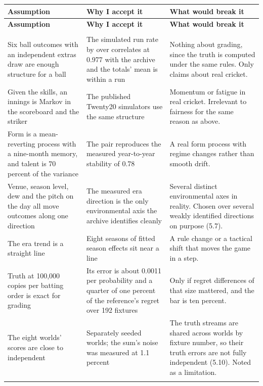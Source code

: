 \documentclass[11pt,letterpaper]{article}
\begin{document}
\begin{small}
\begin{longtable}{>{\raggedright\arraybackslash}p{}>{\raggedright\arraybackslash}p{}>{\raggedright\arraybackslash}p{}}
\toprule
\textbf{Assumption} & \textbf{Why I accept it} & \textbf{What would break it} \\ \midrule
\endfirsthead
\toprule
\textbf{Assumption} & \textbf{Why I accept it} & \textbf{What would break it} \\ \midrule
\endhead
\midrule \multicolumn{3}{r}{\footnotesize continued on the next page} \\ \endfoot
\bottomrule \endlastfoot
Six ball outcomes with an independent extras draw are enough structure for a ball & The simulated run rate by over correlates at 0.977 with the archive and the totals' mean is within a run & Nothing about grading, since the truth is computed under the same rules. Only claims about real cricket. \\ \addlinespace[2pt]
Given the skills, an innings is Markov in the scoreboard and the striker & The published Twenty20 simulators use the same structure & Momentum or fatigue in real cricket. Irrelevant to fairness for the same reason as above. \\ \addlinespace[2pt]
Form is a mean-reverting process with a nine-month memory, and talent is 70 percent of the variance & The pair reproduces the measured year-to-year stability of 0.78 & A real form process with regime changes rather than smooth drift. \\ \addlinespace[2pt]
Venue, season level, dew and the pitch on the day all move outcomes along one direction & The measured era direction is the only environmental axis the archive identifies cleanly & Several distinct environmental axes in reality. Chosen over several weakly identified directions on purpose (5.7). \\ \addlinespace[2pt]
The era trend is a straight line & Eight seasons of fitted season effects sit near a line & A rule change or a tactical shift that moves the game in a step. \\ \addlinespace[2pt]
Truth at 100,000 copies per batting order is exact for grading & Its error is about 0.0011 per probability and a quarter of one percent of the reference's regret over 192 fixtures & Only if regret differences of that size mattered, and the bar is ten percent. \\ \addlinespace[2pt]
The eight worlds' scores are close to independent & Separately seeded worlds; the sum's noise was measured at 1.1 percent & The truth streams are shared across worlds by fixture number, so their truth errors are not fully independent (5.10). Noted as a limitation. \\ \addlinespace[2pt]

\end{longtable}
\end{small}
\end{document}
